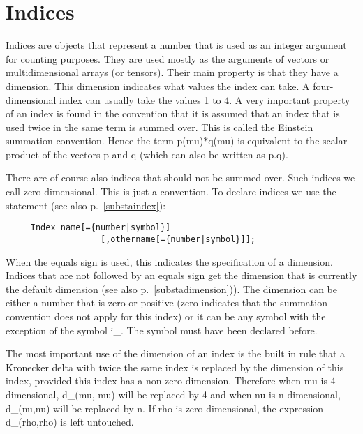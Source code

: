 \section{Indices}

\label{sect-indices}
Indices are objects that represent a number 
that is used as an integer argument for counting purposes. They are used 
mostly as the arguments of vectors or multidimensional arrays (or tensors). 
Their main property is that they have a dimension. This 
dimension indicates what values the index can take. A four-dimensional 
index can usually take the values 1 to 4. A very important property of an 
index is found in the convention that it is assumed that an index that is 
used twice in the same term is summed over. This is called the 
Einstein summation convention. 
Hence the term p(mu)$*$q(mu) is equivalent to the scalar product of the 
vectors p and q (which can also be written as p.q). 

There are of course also indices that should not be summed over. 
Such indices we call zero-dimensional. This is just a convention. 
To declare indices we use the statement (see also p.~\ref{substaindex}): 
\begin{verbatim}
     Index name[={number|symbol}]
                   [,othername[={number|symbol}]];
\end{verbatim}
When the equals sign is used, this indicates the specification of a 
dimension. Indices that are not followed by an equals sign get the 
dimension that is currently the default dimension (see also 
p.~\ref{substadimension})). The dimension can be either a number that is 
zero or positive (zero indicates that the summation convention does not 
apply for this index) or it can be any symbol with the exception of the 
symbol i\_. The symbol must have been declared before. 

The most important use of the dimension of an index is the built in rule 
that a Kronecker delta with twice 
the same index is replaced by the dimension of this index, provided this 
index has a non-zero dimension. Therefore when mu is 4-dimensional, d\_(mu,
mu) will be replaced by 4 and when nu is n-dimensional, d\_(nu,nu) will be 
replaced by n. If rho is zero dimensional, the expression d\_(rho,rho) is 
left untouched.

